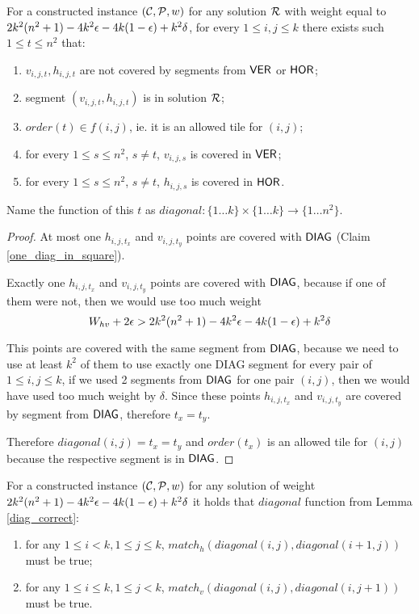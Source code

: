 \begin{lemma}
\label{diag_correct}
For a constructed instance $(\mathcal{C}, \mathcal{P}, w)$
for any solution $\mathcal{R}$ with weight equal to $2k^2(n^2+1) - 4k^2\epsilon -4k(1-\epsilon) +k^2\delta$,
for every $1 \le i,j \le k$
there exists such $1 \le t \le n^2$ that:
\begin{enumerate}[label={(\arabic*)}]
\item $v_{i,j,t}, h_{i,j,t}$ are not covered by segments from $\mathsf{VER}$ or $\mathsf{HOR}$;
\item segment $(v_{i,j,t}, h_{i,j,t})$ is in solution $\mathcal{R}$;
\item $order(t) \in f(i,j)$, ie. it is an allowed tile for $(i,j)$;
\item for every $1 \le s\le n^2$, $s \neq t$, $v_{i,j,s}$ is covered in $\mathsf{VER}$;
\item for every $1 \le s\le n^2$, $s \neq t$, $h_{i,j,s}$ is covered in $\mathsf{HOR}$.
\end{enumerate}
Name the function of this $t$ as
$diagonal : \{1 \ldots k\} \times \{1 \ldots k\} \rightarrow \{1 \ldots n^2\}$.
\end{lemma}

\begin{proof}
At most one $h_{i,j,t_x}$ and $v_{i,j,t_y}$
points are covered with $\mathsf{DIAG}$
(Claim \ref{one_diag_in_square}).
	
Exactly one $h_{i,j,t_x}$ and $v_{i,j,t_y}$
points are covered with $\mathsf{DIAG}$,
because if one of them were not, then we would use too much weight
$$W_{hv} + 2\epsilon > 2k^2(n^2+1) - 4k^2\epsilon -4k(1-\epsilon) +k^2\delta$$

This points are covered with the same segment from $\mathsf{DIAG}$,
because we need to use at least $k^2$ of them to use
exactly one DIAG segment for every pair of $1 \le i,j \le k$,
if we used 2 segments from $\mathsf{DIAG}$
for one pair $(i,j)$,
then we would have used too much weight by $\delta$.
Since these points $h_{i,j,t_x}$ and $v_{i,j,t_y}$ are covered by
segment from $\mathsf{DIAG}$, therefore $t_x = t_y$.

Therefore $diagonal(i,j) = t_x = t_y$
and $order(t_x)$ is an allowed tile for $(i,j)$
because the respective segment is in $\mathsf{DIAG}$.

\end{proof}

\begin{lemma}
\label{vertical_horizontal_synchronized}
For a constructed instance $(\mathcal{C}, \mathcal{P}, w)$
for any solution of weight $2k^2(n^2+1) - 4k^2\epsilon -4k(1-\epsilon) +k^2\delta$ it holds that $diagonal$ function
from Lemma \ref{diag_correct}:
\begin{enumerate}
\item 
for any $1 \le i < k, 1 \le j \le k$,
$match_h(diagonal(i, j),diagonal(i+1, j))$ must be true;
\item 
for any $1 \le i \le k, 1 \le j < k$,
$match_v(diagonal(i, j),diagonal(i, j+1))$ must be true.
\end{enumerate}
\end{lemma}

